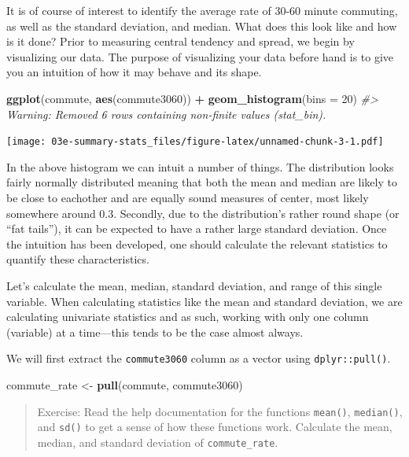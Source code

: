 \documentclass[
]{book}
\newenvironment{Shaded}{\begin{snugshade}}{\end{snugshade}}
\newcommand{\CommentTok}[1]{\textcolor[rgb]{0.56,0.35,0.01}{\textit{#1}}}
\newcommand{\DataTypeTok}[1]{\textcolor[rgb]{0.13,0.29,0.53}{#1}}
\newcommand{\DecValTok}[1]{\textcolor[rgb]{0.00,0.00,0.81}{#1}}
\newcommand{\KeywordTok}[1]{\textcolor[rgb]{0.13,0.29,0.53}{\textbf{#1}}}
\newcommand{\NormalTok}[1]{#1}
\newcommand{\OperatorTok}[1]{\textcolor[rgb]{0.81,0.36,0.00}{\textbf{#1}}}
\newcommand{\StringTok}[1]{\textcolor[rgb]{0.31,0.60,0.02}{#1}}
\begin{document}
It is of course of interest to identify the average rate of 30-60 minute commuting, as well as the standard deviation, and median. What does this look like and how is it done? Prior to measuring central tendency and spread, we begin by visualizing our data. The purpose of visualizing your data before hand is to give you an intuition of how it may behave and its shape.

\begin{Shaded}
\begin{Highlighting}[]
\KeywordTok{ggplot}\NormalTok{(commute, }\KeywordTok{aes}\NormalTok{(commute3060)) }\OperatorTok{+}
\StringTok{  }\KeywordTok{geom\_histogram}\NormalTok{(}\DataTypeTok{bins =} \DecValTok{20}\NormalTok{)}
\CommentTok{\#\textgreater{} Warning: Removed 6 rows containing non{-}finite values (stat\_bin).}
\end{Highlighting}
\end{Shaded}

\texttt{[image: 03e-summary-stats\_files/figure-latex/unnamed-chunk-3-1.pdf]}

In the above histogram we can intuit a number of things. The distribution looks fairly normally distributed meaning that both the mean and median are likely to be close to eachother and are equally sound measures of center, most likely somewhere around 0.3. Secondly, due to the distribution's rather round shape (or ``fat tails''), it can be expected to have a rather large standard deviation. Once the intuition has been developed, one should calculate the relevant statistics to quantify these characteristics.

Let's calculate the mean, median, standard deviation, and range of this single variable. When calculating statistics like the mean and standard deviation, we are calculating univariate statistics and as such, working with only one column (variable) at a time---this tends to be the case almost always.

We will first extract the \texttt{commute3060} column as a vector using \texttt{dplyr::pull()}.

\begin{Shaded}
\begin{Highlighting}[]
\NormalTok{ commute\_rate \textless{}{-}}\StringTok{ }\KeywordTok{pull}\NormalTok{(commute, commute3060)}
\end{Highlighting}
\end{Shaded}

\begin{quote}
Exercise: Read the help documentation for the functions \texttt{mean()}, \texttt{median()}, and \texttt{sd()} to get a sense of how these functions work. Calculate the mean, median, and standard deviation of \texttt{commute\_rate}.
\end{quote}
\end{document}
